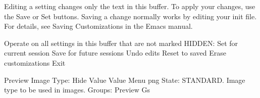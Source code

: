 

Editing a setting changes only the text in this buffer.
To apply your changes, use the Save or Set buttons.
Saving a change normally works by editing your init file.
For details, see Saving Customizations in the Emacs manual.


 Operate on all settings in this buffer that are not marked HIDDEN:
 Set for current session Save for future sessions
 Undo edits Reset to saved Erase customizations   Exit

Preview Image Type: Hide Value Value Menu png
   State: STANDARD.
   Image type to be used in images.
Groups: Preview Gs


